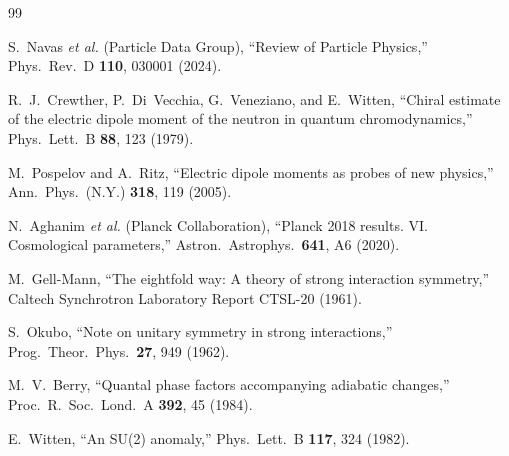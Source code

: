 \documentclass[aps,prd,reprint,twocolumn,showpacs,superscriptaddress]{revtex4-2}
\begin{document}
\begin{thebibliography}{99}

S.~Navas \emph{et al.} (Particle Data Group),
``Review of Particle Physics,''
Phys.\ Rev.\ D \textbf{110}, 030001 (2024).

R.~J.~Crewther, P.~Di~Vecchia, G.~Veneziano, and E.~Witten,
``Chiral estimate of the electric dipole moment of the neutron in
quantum chromodynamics,''
Phys.\ Lett.\ B \textbf{88}, 123 (1979).

M.~Pospelov and A.~Ritz,
``Electric dipole moments as probes of new physics,''
Ann.\ Phys.\ (N.Y.) \textbf{318}, 119 (2005).

N.~Aghanim \emph{et al.} (Planck Collaboration),
``Planck 2018 results. VI. Cosmological parameters,''
Astron.\ Astrophys.\ \textbf{641}, A6 (2020).

M.~Gell-Mann,
``The eightfold way: A theory of strong interaction symmetry,''
Caltech Synchrotron Laboratory Report CTSL-20 (1961).

S.~Okubo,
``Note on unitary symmetry in strong interactions,''
Prog.\ Theor.\ Phys.\ \textbf{27}, 949 (1962).

M.~V.~Berry,
``Quantal phase factors accompanying adiabatic changes,''
Proc.\ R.\ Soc.\ Lond.\ A \textbf{392}, 45 (1984).

E.~Witten,
``An SU(2) anomaly,''
Phys.\ Lett.\ B \textbf{117}, 324 (1982).

\end{thebibliography}
\end{document}
